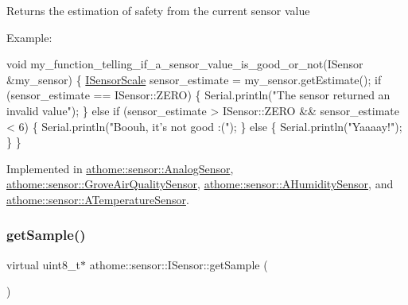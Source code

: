 Returns the estimation of safety from the current sensor value

Example\+:


\begin{DoxyCode}
\textcolor{keywordtype}{void} my\_function\_telling\_if\_a\_sensor\_value\_is\_good\_or\_not(ISensor &my\_sensor) \{
  \mbox{\hyperlink{classathome_1_1sensor_1_1_i_sensor_aa70bc27a4c17c86caf96cca776541ddf}{ISensorScale}} sensor\_estimate = my\_sensor.getEstimate();
  \textcolor{keywordflow}{if} (sensor\_estimate == ISensor::ZERO) \{
    Serial.println(\textcolor{stringliteral}{"The sensor returned an invalid value"});
  \}
  \textcolor{keywordflow}{else} \textcolor{keywordflow}{if} (sensor\_estimate > ISensor::ZERO && sensor\_estimate < 6) \{
    Serial.println(\textcolor{stringliteral}{"Boouh, it's not good :("});
  \}
  \textcolor{keywordflow}{else} \{
    Serial.println(\textcolor{stringliteral}{"Yaaaay!"});
  \}
\}
\end{DoxyCode}
 

Implemented in \mbox{\hyperlink{classathome_1_1sensor_1_1_analog_sensor_a728e2f65638f488cd1829c5f318531db}{athome\+::sensor\+::\+Analog\+Sensor}}, \mbox{\hyperlink{classathome_1_1sensor_1_1_grove_air_quality_sensor_a3eeec77eb0bbf3932cdfa9d33a708e57}{athome\+::sensor\+::\+Grove\+Air\+Quality\+Sensor}}, \mbox{\hyperlink{classathome_1_1sensor_1_1_a_humidity_sensor_a1da82433989c79066ce32d5606f4f675}{athome\+::sensor\+::\+A\+Humidity\+Sensor}}, and \mbox{\hyperlink{classathome_1_1sensor_1_1_a_temperature_sensor_a3997ff080f6a9e444c52a63f1b40d73c}{athome\+::sensor\+::\+A\+Temperature\+Sensor}}.

\mbox{\label{classathome_1_1sensor_1_1_i_sensor_a2513fd8acc5d8251439330ca0e78cf04}} 
\subsubsection{\texorpdfstring{get\+Sample()}{getSample()}}
{\footnotesize\ttfamily virtual uint8\+\_\+t$\ast$ athome\+::sensor\+::\+I\+Sensor\+::get\+Sample (\begin{DoxyParamCaption}{ }\end{DoxyParamCaption})\hspace{0.3cm}{\ttfamily [pure virtual]}}


